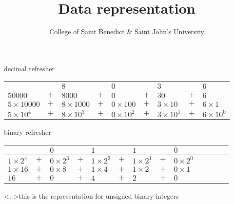 \documentclass[10pt,t,svgnames]{beamer}
\title{Data representation}
\date{}
\author{College of Saint Benedict \& Saint John's University}
\begin{document}
  \maketitle

  \begin{frame}{decimal refresher}
    \renewcommand{\arraystretch}{2}
    \begin{center}
      \footnotesize
      \begin{tabularx}{\textwidth}{XcXcXcXcX}
        \only<+->{$5$ && $8$ && $0$ && $3$ && $6$\\\hline
                  $50000$ & $+$ & $8000$ & $+$ & $0$ & $+$ & $30$ & $+$ & $6$}
        \only<+->{\\\hline
                  $5\times10000$ & $+$ & $8\times1000$ & $+$ & $0\times100$ & $+$ & $3\times10$ & $+$ & $6\times1$}
        \only<+->{\\\hline
                  $5\times10^4$ & $+$ & $8\times10^3$ & $+$ & $0\times10^2$ & $+$ & $3\times10^1$ & $+$ & $6\times10^0$}
      \end{tabularx}
    \end{center}
  \end{frame}

  \begin{frame}{binary refresher}
    \renewcommand{\arraystretch}{2}
    \begin{center}
      \footnotesize
      \begin{tabularx}{\textwidth}{XcXcXcXcXcXcX}
        \only<+->{$1$ && $0$ && $1$ && $1$ && $0$\\\hline
                  $1\times2^4$ & $+$ & $0\times2^3$ & $+$ & $1\times2^2$ & $+$ & $1\times2^1$ & $+$ & $0\times2^0$}
        \only<+->{\\\hline
                  $1\times16$ & $+$ & $0\times8$ & $+$ & $1\times4$ & $+$ & $1\times2$ & $+$ & $0\times1$}
        \only<+->{\\\hline
                  $16$ & $+$ & $0$ & $+$ & $4$ & $+$ & $2$ & $+$ & $0$}
      \end{tabularx}
    \end{center}

    \note[item]<.->{this is the representation for unsigned binary integers}
  \end{frame}
\end{document}
